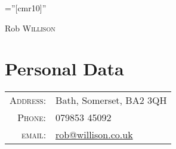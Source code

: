 \documentclass[a4paper,10pt]{article}
\begin{document}

\pagestyle{empty} %

\font\fb=''[cmr10]'' %
\fontsize{30pt}{36pt}\selectfont
\par{\centering
		{Rob \textsc{Willison}
	}\bigskip\par}

\section{Personal Data}
\fontsize{12pt}{12pt}\selectfont
\begin{tabular}{rl}
    \textsc{Address:}   & Bath, Somerset, BA2 3QH\\
    \textsc{Phone:}     & 079853 45092\\
    \textsc{email:}     & \href{mailto:rob@willison.co.uk}{rob@willison.co.uk}
\end{tabular}

\end{document}
